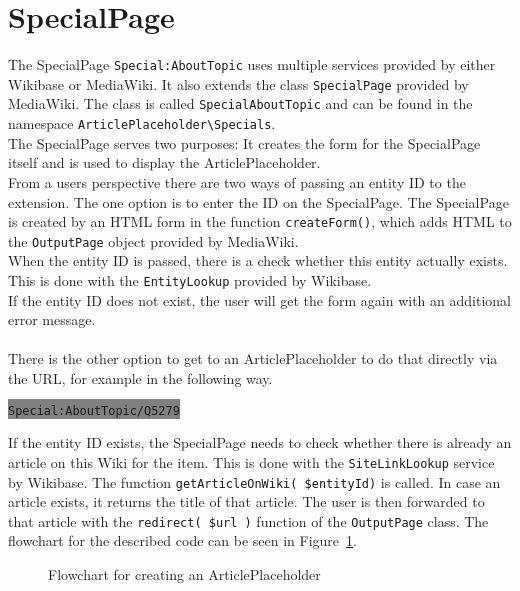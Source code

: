 \section{SpecialPage}

The SpecialPage \texttt{\justify Special:AboutTopic} uses multiple services provided by either Wikibase or MediaWiki. It also extends the class \texttt{\justify SpecialPage} provided by MediaWiki. The class is called \texttt{\justify SpecialAboutTopic} and can be found in the namespace \texttt{\justify ArticlePlaceholder\textbackslash{}Specials}. \\
The SpecialPage serves two purposes: It creates the form for the SpecialPage itself and is used to display the ArticlePlaceholder. \\
From a users perspective there are two ways of passing an entity ID to the extension. 
The one option is to enter the ID on the SpecialPage. The SpecialPage is created by an HTML form in the function \texttt{\justify createForm()}, which adds HTML to the \texttt{\justify OutputPage} object provided by MediaWiki. \\
When the entity ID is passed, there is a check whether this entity actually exists. This is done with the \texttt{\justify EntityLookup} provided by Wikibase. \\ If the entity ID does not exist, the user will get the form again with an additional error message. \\
\\
There is the other option to get to an ArticlePlaceholder to do that directly via the URL, for example in the following way. 
\begin{center}
\colorbox{Gray}{\lstinline[basicstyle=\ttfamily\color{white}]|Special:AboutTopic/Q5279|}
\end{center}

If the entity ID exists, the SpecialPage needs to check whether there is already an article on this Wiki for the item. This is done with the \texttt{\justify SiteLinkLookup} service by Wikibase. The function \texttt{\justify getArticleOnWiki( \$entityId)} is called. In case an article exists, it returns the title of that article. The user is then forwarded to that article with the \texttt{\justify redirect( \$url )} function of the \texttt{\justify OutputPage} class.
The flowchart for the described code can be seen in Figure~\ref{fig:createpl}. 
\begin{figure}[H]
	\centering
	
	\caption{Flowchart for creating an ArticlePlaceholder}
	\label{fig:createpl}
\end{figure}

